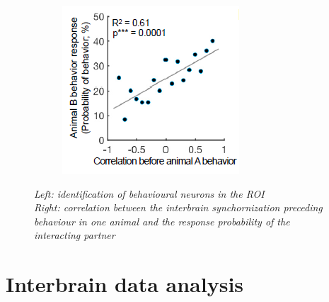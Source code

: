 \documentclass[a4paper]{article}
\begin{document}
\begin{figure}[H]
\begin{minipage}{\linewidth}
\begin{minipage}{0.4\linewidth}
\begin{figure}[H]
			\end{figure}
		\end{minipage}
		\hspace{0.05\linewidth}
		\begin{minipage}{0.5\linewidth}
			\begin{figure}[H]
				\includegraphics[width=\linewidth]{kingsbury3.png}
				
			\end{figure}
		\end{minipage}
		
	\end{minipage}
	\caption{\textit{Left: identification of behavioural neurons in the ROI \\
			Right: correlation between the interbrain synchornization preceding behaviour in one animal and the response probability of the interacting partner}}
\end{figure}

\newpage

\section{Interbrain data analysis}
\end{document}
